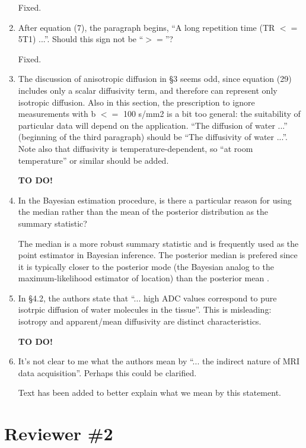 \documentclass[11pt]{article}
\begin{document}
\begin{enumerate}
  Fixed.

\item After equation (7), the paragraph begins, ``A long repetition
  time (TR $<=$ 5T1) ...''. Should this sign not be ``$>=$''?

  Fixed.

\item The discussion of anisotropic diffusion in \S3 seems odd, since
  equation (29) includes only a scalar diffusivity term, and therefore
  can represent only isotropic diffusion. Also in this section, the
  prescription to ignore measurements with b $<=$ 100 s/mm2 is a bit
  too general: the suitability of particular data will depend on the
  application. ``The diffusion of water ...'' (beginning of the third
  paragraph) should be ``The diffusivity of water ...''. Note also
  that diffusivity is temperature-dependent, so ``at room
  temperature'' or similar should be added.

  \textbf{TO DO!}

\item In the Bayesian estimation procedure, is there a particular
  reason for using the median rather than the mean of the posterior
  distribution as the summary statistic?

  The median is a more robust summary statistic and is frequently used
  as the point estimator in Bayesian inference.  The posterior median
  is prefered since it is typically closer to the posterior mode (the
  Bayesian analog to the maximum-likelihood estimator of location)
  than the posterior mean \citep{car-lou:Bayesian}.

\item In \S4.2, the authors state that ``... high ADC values correspond
  to pure isotrpic diffusion of water molecules in the tissue''.  This
  is misleading: isotropy and apparent/mean diffusivity are distinct
  characteristics.

  \textbf{TO DO!}

\item It's not clear to me what the authors mean by ``... the indirect
  nature of MRI data acquisition''.  Perhaps this could be clarified.

  Text has been added to better explain what we mean by this
  statement.

\end{enumerate}

\section*{Reviewer \#2}
\end{document}
